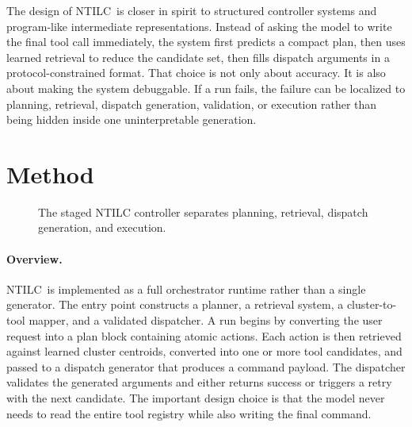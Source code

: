 \documentclass[10pt,twocolumn,letterpaper]{article}
\newcommand{\method}{NTILC}
\begin{document}
The design of \method\ is closer in spirit to structured controller systems and program-like intermediate representations. Instead of asking the model to write the final tool call immediately, the system first predicts a compact plan, then uses learned retrieval to reduce the candidate set, then fills dispatch arguments in a protocol-constrained format. That choice is not only about accuracy. It is also about making the system debuggable. If a run fails, the failure can be localized to planning, retrieval, dispatch generation, validation, or execution rather than being hidden inside one uninterpretable generation.

\section{Method}
\begin{figure}[t]
\centering
{}
\caption{The staged NTILC controller separates planning, retrieval, dispatch generation, and execution.}
\label{fig:pipeline}
\end{figure}

\paragraph{Overview.}
\method\ is implemented as a full orchestrator runtime rather than a single generator. The entry point constructs a planner, a retrieval system, a cluster-to-tool mapper, and a validated dispatcher. A run begins by converting the user request into a plan block containing atomic actions. Each action is then retrieved against learned cluster centroids, converted into one or more tool candidates, and passed to a dispatch generator that produces a command payload. The dispatcher validates the generated arguments and either returns success or triggers a retry with the next candidate. The important design choice is that the model never needs to read the entire tool registry while also writing the final command.
\end{document}
